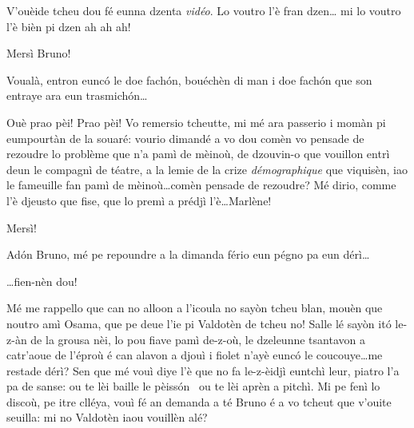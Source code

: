 \begin{drama}


\Brunospeaks {} V'ouèide tcheu dou fé eunna dzenta \textit{vidéo}.  Lo voutro l'è fran dzen\ldots {} mi lo voutro l'è bièn pi dzen ah ah ah!

\Presidanspeaks Mersì Bruno!

\Brunospeaks {} Voualà, entron eunc\'o le doe fach\'on, bouéchèn di man i doe fach\'on que son entraye ara eun trasmich\'on\ldots


\Brunospeaks Ouè prao pèi! Prao pèi! Vo remersio tcheutte, mi mé ara passerio i momàn pi eumpourtàn de la souaré: vourio dimandé a vo dou comèn vo pensade de rezoudre lo problème que n'a pamì de mèinoù, de dzouvin-o que vouillon entrì deun le compagnì de téatre, a la lemie de la crize \textit{démographique} que viquisèn, iao le fameuille fan pamì de mèinoù\ldots comèn pensade de rezoudre? Mé dirio, comme l'è djeusto que fise, que lo premì a prédjì  l'è\ldots Marlène!

\Presidanspeaks Mersì!


\Presidanspeaks Ad\'on Bruno, mé pe repoundre a la dimanda fério eun pégno pa eun dérì\ldots

\Brunospeaks \ldots fien-nèn dou!


\Presidanspeaks Mé me rappello que can no alloon a l’icoula no sayòn tcheu blan, mouèn que noutro amì Osama, que pe deue l'ie pi Valdotèn de tcheu no! Salle lé sayòn it\'o le-z-àn de la grousa nèi, lo pou fiave pamì de-z-où\ou , le dzeleunne tsantavon a catr'aoue de l'éproù é can alavon a djouì i fiolet n'ayè eunc\'o le coucouye\ldots me restade dérì? Sen que mé vouì diye l'è que no fa le-z-èidjì euntchì leur, piatro l'a pa de sanse: ou te lèi baille le pèiss\'on \pesce\ ou te lèi aprèn a pitchì. Mi pe fenì lo discoù, pe itre clléya, vouì fé an demanda a té Bruno é a vo tcheut que v'ouite seuilla: mi no Valdotèn iaou vouillèn alé?


\end{drama}
